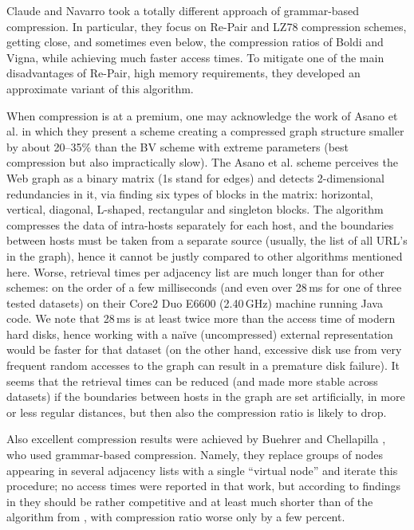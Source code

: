 \documentclass[envcountsame]{llncs}
\begin{document}
Claude and Navarro \cite{CNtr08,CNtweb10} took a totally different approach of grammar-based 
compression. In particular, they focus on Re-Pair \cite{OffDict2000} and LZ78 
compression schemes, getting close, and sometimes even below, the compression 
ratios of Boldi and Vigna, while achieving much faster access times.
To mitigate one of the main disadvantages of Re-Pair, high memory requirements, 
they developed an approximate variant of this algorithm.

When compression is at a premium, one may acknowledge the work of Asano et al. 
\cite{DBLP:conf/cocoon/AsanoMN08}
in which they present a scheme creating a compressed graph structure smaller 
by about 20--35\% than the BV scheme with extreme parameters (best compression but 
also impractically slow). The Asano et al. scheme perceives the Web graph 
as a binary matrix (1s stand for edges) and detects 2-dimensional redundancies 
in it, via finding six types of blocks in the matrix: horizontal, vertical, diagonal, 
L-shaped, rectangular and singleton blocks. The algorithm compresses the data 
of intra-hosts separately for each host, and the boundaries between hosts must be 
taken from a separate source (usually, the list of all URL's in the graph), hence 
it cannot be justly compared to other algorithms mentioned here. 
Worse, retrieval times per adjacency list are much longer than for other schemes: 
on the order of a few milliseconds (and even over 28\,ms for one of three tested 
datasets) on their Core2 Duo E6600 (2.40\,GHz) machine running Java code.
We note that 28\,ms is at least twice more than the access time of modern hard disks, 
hence working with a na\"ive (uncompressed) external representation would be 
faster for that dataset (on the other hand, excessive disk use from very frequent
random accesses to the graph can result in a premature disk failure).
It seems that the retrieval times can be reduced (and made more stable across 
datasets) if the boundaries between hosts in the graph are set artificially, 
in more or less regular distances, but then also the compression ratio is likely 
to drop. 

Also excellent compression results were achieved by Buehrer and Chellapilla
\cite{DBLP:conf/wsdm/BuehrerC08}, who used grammar-based compression. 
Namely, they replace groups of nodes appearing in several adjacency lists with a 
single ``virtual node'' and iterate this procedure; no access times were reported 
in that work, but according to findings in \cite{DBLP:conf/birthday/ClaudeN10} 
they should be rather competitive and at least much shorter than 
of the algorithm from \cite{DBLP:conf/cocoon/AsanoMN08}, with compression ratio 
worse only by a few percent.
\end{document}
